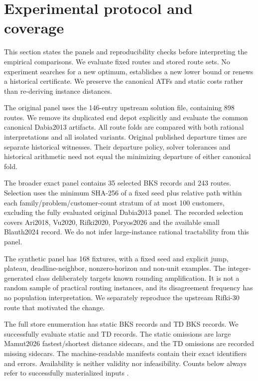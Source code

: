 \section{Experimental protocol and coverage}\label{sec:protocol}

This section states the panels and reproducibility checks before interpreting the empirical comparisons. We evaluate fixed routes and stored route sets. No experiment searches for a new optimum, establishes a new lower bound or renews a historical certificate. We preserve the canonical ATFs and static costs rather than re-deriving instance distances.

The original panel uses the 146-entry upstream solution file, containing 898 routes. We remove its duplicated end depot explicitly and evaluate the common canonical Dabia2013 artifacts. All route folds are compared with both rational interpretations and all isolated variants. Original published departure times are separate historical witnesses. Their departure policy, solver tolerances and historical arithmetic need not equal the minimizing departure of either canonical fold.

The broader exact panel contains 35 selected BKS records and 243 routes. Selection uses the minimum SHA-256 of a fixed seed plus relative path within each family/problem/customer-count stratum of at most 100 customers, excluding the fully evaluated original Dabia2013 panel. The recorded selection covers Ari2018, Vu2020, Rifki2020, Poryos2026 and the available small Blauth2024 record. We do not infer large-instance rational tractability from this panel.

The synthetic panel has 168 fixtures, with a fixed seed and explicit jump, plateau, deadline-neighbor, nonzero-horizon and non-unit examples. The integer-generated class deliberately targets known rounding amplification. It is not a random sample of practical routing instances, and its disagreement frequency has no population interpretation. We separately reproduce the upstream Rifki-30 route that motivated the change.

The full store enumeration has \StaticEnumerated{} static BKS records and \TDEnumerated{} TD BKS records. We successfully evaluate \StaticComplete{} static and \TDComplete{} TD records. The \StaticMissing{} static omissions are large Mamut2026 fastest/shortest distance sidecars, and the \TDMissing{} TD omissions are recorded missing sidecars. The machine-readable manifests contain their exact identifiers and errors. Availability is neither validity nor infeasibility. Counts below always refer to successfully materialized inputs \autocite{onyrInvestigation2026}.

